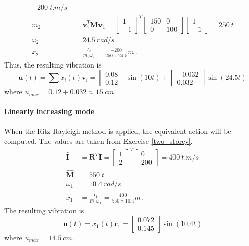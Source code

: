 \begin{Answer}[ref={two_storey_helicopter}]
\begin{align*}
    \SI{-200}{t.m/s} \\
    m_2 &= \mathbf{v}_1^T\mathbf{M}\mathbf{v}_1 =
    \begin{bmatrix}1 \\ -1\end{bmatrix}^T \begin{bmatrix}150 & 0 \\ 0 & 100\end{bmatrix} \begin{bmatrix}1 \\ -1\end{bmatrix} =
    \SI{250}{t} \\
    \omega_2 &= \SI{24.5}{rad/s} \\
    x_2 &= \frac{I_2}{m_2\omega_2} = \frac{-200}{250\times24.5} \si{m}\,.
\end{align*}
Thus, the resulting vibration is
$$
\mathbf{u}(t) = \sum x_i(t)\mathbf{v}_i =
\begin{bmatrix}0.08 \\ 0.12\end{bmatrix} \sin(10t) +
\begin{bmatrix}-0.032 \\ 0.032\end{bmatrix} \sin(24.5t)
$$
where $u_{max} = 0.12 + 0.032 \approx \SI{15}{cm}$.


\paragraph{Linearly increasing mode}
When the Ritz-Rayleigh method is applied, the equivalent action will be computed. The values are taken from Exercise \ref{two_storey}.
\begin{align*}
    \hat{\mathbf{I}} &= \mathbf{R}^T\mathbf{I} =
    \begin{bmatrix}1 \\ 2\end{bmatrix}^T \begin{bmatrix}0 \\ 200\end{bmatrix} =
    \SI{400}{t.m/s} \\
    \hat{\mathbf{M}} &= \SI{550}{t} \\
    \omega_1 &= \SI{10.4}{rad/s} \\
    x_1 &= \frac{\hat{I}_1}{\hat{m}_1\omega_1} = \frac{400}{550\times10.4} \si{m}\,.
\end{align*}
The resulting vibration is
$$
\mathbf{u}(t) = x_1(t)\mathbf{r}_1 =
\begin{bmatrix}0.072 \\ 0.145\end{bmatrix} \sin(10.4t)
$$
where $u_{max} = \SI{14.5}{cm}$.

\end{Answer}
